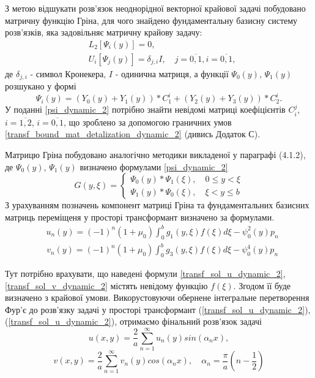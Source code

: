 З метою відшукати розв'язок неоднорідної векторної крайової задачі побудовано матричну функцію Гріна,
для чого знайдено фундаментальну базисну систему розв'язків, яка задовільняє матричну крайову задачу:
\begin{align}\label{psi_probl_dynamic_2}
    &L_2\left[ \Psi_i(y) \right] = 0, \nonumber \\
    &U_i\left[ \Psi_j(y) \right] = \delta_{j,i} I, \quad j= \overline{0, 1}, i= \overline{0, 1},
\end{align}
де $\delta_{j,i}$ - символ Кронекера, $I$ - одинична матриця, а функції  $\Psi_0(y)$, $\Psi_1(y)$ розшукано у формі
\begin{equation}\label{psi_dynamic_2}
    \Psi_i(y) = \left( Y_0(y) + Y_1(y) \right) * C_1^i + \left( Y_2(y) + Y_3(y) \right) * C_2^i.
\end{equation}
У поданні \eqref{psi_dynamic_2} потрібно знайти невідомі матриці коефіцієнтів $C_i^j$, $i=\overline{1, 2}$, $i=\overline{0,  1}$,
що зроблено за допомогою граничних умов \eqref{transf_bound_mat_detalization_dynamic_2} (дивись Додаток С).

Матрицю Гріна побудовано аналогічно методики викладеної у параграфі (4.1.2),
де $\Psi_0(y)$, $\Psi_1(y)$ визначено формулами \eqref{psi_dynamic_2}
\begin{equation}
    G(y,\xi) = 
    \begin{cases}
        \Psi_0(y) * \Psi_1(\xi), \quad 0 \le y < \xi \\
        \Psi_1(y) * \Psi_0(\xi), \quad \xi < y \le b
    \end{cases}
\end{equation}
З урахуванням позначень компонент матриці Гріна та фундаментальних базисних матриць 
переміщеня у просторі трансформант визначено за формулами.
\begin{align}\label{transf_sol_u_dynamic_2}
    &u_n(y) = (-1)^n (1+\mu_0) \int_0^b g_1(y, \xi)f(\xi) d\xi - \psi_0^2(y) p_n
\end{align}
\begin{align}\label{transf_sol_v_dynamic_2}
    &v_n(y) = (-1)^n (1+\mu_0) \int_0^b g_3(y, \xi)f(\xi) d\xi - \psi_0^4(y) p_n
\end{align}

Тут потрібно врахувати, що наведені формули \eqref{transf_sol_u_dynamic_2}, \eqref{transf_sol_v_dynamic_2} містять невідому функцію $f(\xi)$.
Згодом її буде визначено з крайової умови.
Викорустовуючи обернене інтегральне перетворення Фур'є до розв'язку задачі у просторі трансформант
(\ref{transf_sol_u_dynamic_2}), (\ref{transf_sol_u_dynamic_2}), отримаємо фінальний розв'язок задачі
\begin{equation}
    u(x,y) = \frac{2}{a} \sum_{n=1}^{\infty} u_n(y) sin(\alpha_n x),
\end{equation}
\begin{equation}
    v(x,y) = \frac{2}{a} \sum_{n=1}^{\infty} v_n(y) cos(\alpha_n x), \quad \alpha_n = \frac{\pi}{a}(n - \frac{1}{2})
\end{equation}

